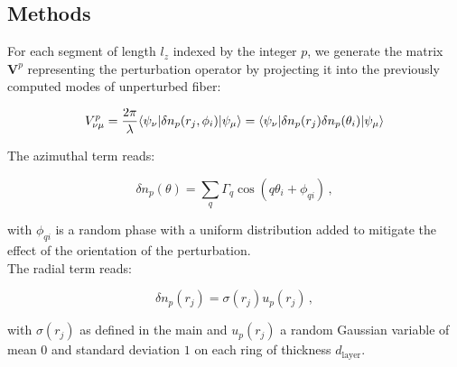 \documentclass[aps,prl,twocolumn, amsmath,amssymb,superscriptaddress]{revtex4-2}
\DeclarePairedDelimiter\bra{\langle}{\rvert}
\DeclarePairedDelimiter\ket{\lvert}{\rangle}
\begin{document}
\subsection*{Methods}



For each segment of length $l_z$ indexed by the integer $p$, 
we generate the matrix $\mathbf{V}^p$ representing the perturbation operator 
by projecting it into the previously computed modes of unperturbed fiber:

\begin{equation}
V^p_{\nu \mu} = \frac{2\pi}{\lambda} \bra{\psi_\nu} \delta n_p(r_j,\phi_i) \ket{\psi_\mu} = \bra{\psi_\nu} \delta n_p(r_j)  \delta n_p(\theta_i) \ket{\psi_\mu}
\end{equation}





The azimuthal term reads:

\begin{equation}
     \delta n_p(\theta) =  \sum_q \Gamma_q\cos(q \theta_i+\phi_{qi}) \, , 
\end{equation}


with $\phi_{qi}$ is a random phase with a uniform distribution 
added to mitigate the effect of the orientation of the perturbation.\\

The radial term reads:

\begin{equation}
     \delta n_p(r_j) = \sigma(r_j) u_p(r_j) \, , 
\end{equation}

with $\sigma(r_j)$ as defined in the main and $u_p(r_j)$ 
a random Gaussian variable of mean $0$ and standard deviation $1$ 
on each ring of thickness $d_\text{layer}$.
\end{document}
